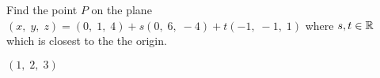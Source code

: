
\begin{Exercise}[
name={},
title={}, 
difficulty=0,
origin={\cite{BS}}]
Find the point $P$ on the plane $(x,\; y,\; z) = (0,\; 1,\; 4) + s(0,\; 6,\; -4) + t(-1,\; -1,\; 1)$ where $s, t\in\mathbb{R}$ which is closest to the the origin.

\end{Exercise}
\begin{Answer}
$(1,\;2,\;3)$
\end{Answer}
